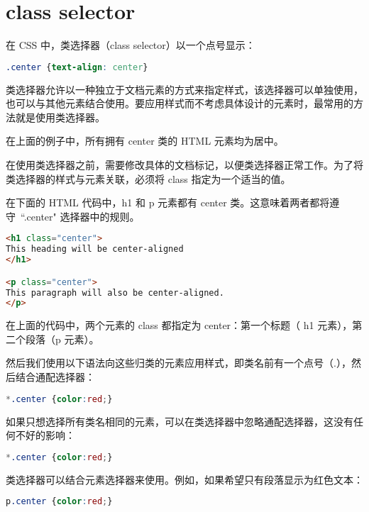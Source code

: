 \section{class selector}


在 CSS 中，类选择器（class selector）以一个点号显示：

\begin{lstlisting}[language=CSS]
.center {text-align: center}
\end{lstlisting}

类选择器允许以一种独立于文档元素的方式来指定样式，该选择器可以单独使用，也可以与其他元素结合使用。要应用样式而不考虑具体设计的元素时，最常用的方法就是使用类选择器。

在上面的例子中，所有拥有 center 类的 HTML 元素均为居中。

在使用类选择器之前，需要修改具体的文档标记，以便类选择器正常工作。为了将类选择器的样式与元素关联，必须将 class 指定为一个适当的值。

在下面的 HTML 代码中，h1 和 p 元素都有 center 类。这意味着两者都将遵守~``.center" 选择器中的规则。



\begin{lstlisting}[language=HTML]
<h1 class="center">
This heading will be center-aligned
</h1>

<p class="center">
This paragraph will also be center-aligned.
</p>
\end{lstlisting}


在上面的代码中，两个元素的 class 都指定为 center：第一个标题（ h1 元素），第二个段落（p 元素）。

然后我们使用以下语法向这些归类的元素应用样式，即类名前有一个点号（.），然后结合通配选择器：

\begin{lstlisting}[language=CSS]
*.center {color:red;}
\end{lstlisting}


如果只想选择所有类名相同的元素，可以在类选择器中忽略通配选择器，这没有任何不好的影响：

\begin{lstlisting}[language=CSS]
*.center {color:red;}
\end{lstlisting}


类选择器可以结合元素选择器来使用。例如，如果希望只有段落显示为红色文本：

\begin{lstlisting}[language=CSS]
p.center {color:red;}
\end{lstlisting}

